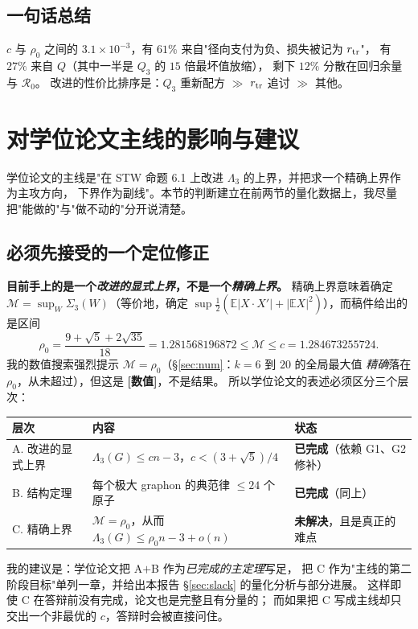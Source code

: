 \documentclass[UTF8,11pt]{ctexart}
\theoremstyle{definition}
\newcommand{\E}{\mathbb{E}}
\newcommand{\num}{\textcolor[rgb]{0.55,0.35,0.00}{\bfseries [数值]}}
\begin{document}
\subsection{一句话总结}

$c$ 与 $\rho_0$ 之间的 $3.1\times10^{-3}$，有 $61\%$ 来自"径向支付为负、损失被记为 $r_{\rm tr}$"，
有 $27\%$ 来自 $Q$（其中一半是 $Q_3$ 的 $15$ 倍最坏值放缩），
剩下 $12\%$ 分散在回归余量与 $\mathcal R_0$。
改进的性价比排序是：$Q_3$ 重新配方 $\gg$ $r_{\rm tr}$ 追讨 $\gg$ 其他。

\section{对学位论文主线的影响与建议}\label{sec:thesis}

学位论文的主线是"在 STW 命题 6.1 上改进 $\Lambda_3$ 的上界，并把求一个精确上界作为主攻方向，
下界作为副线"。本节的判断建立在前两节的量化数据上，我尽量把"能做的"与"做不动的"分开说清楚。

\subsection{必须先接受的一个定位修正}

\textbf{目前手上的是一个\emph{改进的显式上界}，不是一个\emph{精确上界}。}
精确上界意味着确定 $\mathcal M=\sup_W\Sigma_3(W)$（等价地，确定
$\sup\frac12(\E|X\cdot X'|+|\E X|^2)$），而稿件给出的是区间
\[
 \rho_0=\frac{9+\sqrt5+2\sqrt{35}}{18}=1.281568196872\le\mathcal M\le c=1.284673255724 .
\]
我的数值搜索强烈提示 $\mathcal M=\rho_0$（\S\ref{sec:num}：$k=6$ 到 $20$ 的全局最大值
\emph{精确}落在 $\rho_0$，从未超过），但这是 \num，不是结果。
所以学位论文的表述必须区分三个层次：
\begin{center}
\small
\begin{tabular}{@{}p{}p{}p{}@{}}
\toprule
层次 & 内容 & 状态\\
\midrule
A. 改进的显式上界 & $\Lambda_3(G)\le cn-3$，$c<(3+\sqrt5)/4$ & \textbf{已完成}（依赖 G1、G2 修补）\\
B. 结构定理 & 每个极大 graphon 的典范律 $\le24$ 个原子 & \textbf{已完成}（同上）\\
C. 精确上界 & $\mathcal M=\rho_0$，从而 $\Lambda_3(G)\le\rho_0 n-3+o(n)$ & \textbf{未解决}，且是真正的难点\\
\bottomrule
\end{tabular}
\end{center}
\noindent 我的建议是：学位论文把 A$+$B 作为\emph{已完成的主定理}写足，
把 C 作为"主线的第二阶段目标"单列一章，并给出本报告 \S\ref{sec:slack} 的量化分析与部分进展。
这样即使 C 在答辩前没有完成，论文也是完整且有分量的；
而如果把 C 写成主线却只交出一个非最优的 $c$，答辩时会被直接问住。
\end{document}
